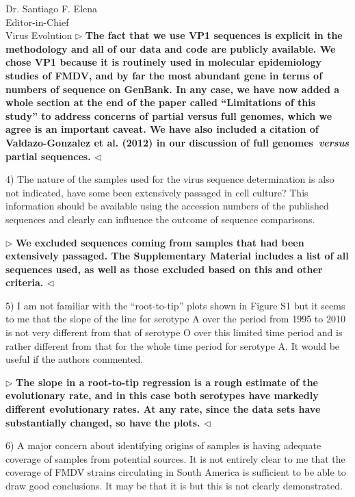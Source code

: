 \documentclass[12pt, a4paper]{letter} %
\newenvironment{reply}{$\triangleright$\bf}{$\triangleleft$}
\begin{document}
\begin{letter}{
	Dr. Santiago F. Elena\\
    Editor-in-Chief \\
    Virus Evolution
}
\begin{reply}
The fact that we use VP1 sequences is explicit in the methodology and all of our data and code are publicly available.
We chose VP1 because it is routinely used in molecular epidemiology studies of FMDV, and by far the most abundant gene in terms of numbers of sequence on GenBank.
In any case, we have now added a whole section at the end of the paper called ``Limitations of this study'' to address concerns of partial versus full genomes, which we agree is an important caveat.
We have also included a citation of Valdazo-Gonzalez et al. (2012) in our discussion of full genomes~\textit{versus} partial sequences.
\end{reply}

4) The nature of the samples used for the virus sequence determination is also not indicated, have some been extensively passaged in cell culture? 
This information should be available using the accession numbers of the published sequences and clearly can influence the outcome of sequence comparisons.

\begin{reply}
We excluded sequences coming from samples that had been extensively passaged. 
The Supplementary Material includes a list of all sequences used, as well as those excluded based on this and other criteria. 
\end{reply}

5) I am not familiar with the ``root-to-tip'' plots shown in Figure S1 but it seems to me that the slope of the line for serotype A over the period from 1995 to 2010 is not very different from that of serotype O over this limited time period and is rather different from that for the whole time period for serotype A. 
It would be useful if the authors commented.

\begin{reply}
The slope in a root-to-tip regression is a rough estimate of the evolutionary rate, and in this case both serotypes have markedly different evolutionary rates.
At any rate, since the data sets have substantially changed, so have the plots.
\end{reply}

6)      A major concern about identifying origins of samples is having adequate coverage of samples from potential sources. 
It is not entirely clear to me that the coverage of FMDV strains circulating in South America is sufficient to be able to draw good conclusions. 
It may be that it is but this is not clearly demonstrated.


\end{letter}
\end{document}
